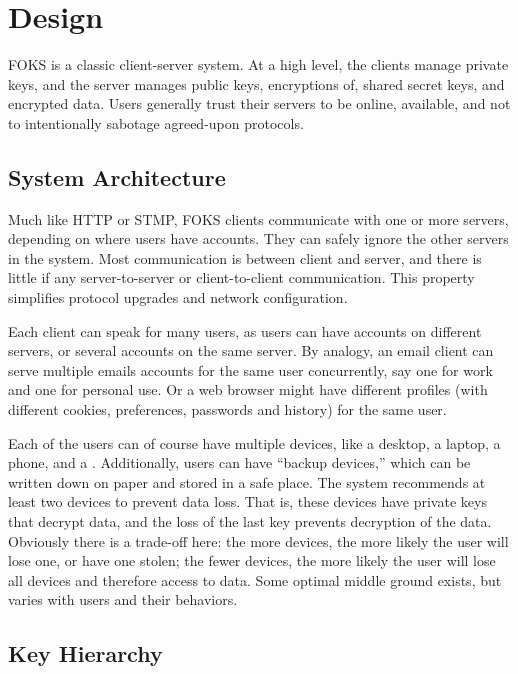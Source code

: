 
\section{Design}
\label{sec:design}

FOKS is a classic client-server system. At a high level, the clients
manage private keys, and the server manages public keys, encryptions of, 
shared secret keys, and encrypted data. Users generally trust their
servers to be online, available, and not to intentionally sabotage
agreed-upon protocols. 

\subsection{System Architecture}

Much like HTTP or STMP, FOKS clients communicate with one or more servers,
depending on where users have accounts. They can safely ignore the other servers
in the system. Most communication is between client and server, and there is
little if any server-to-server or client-to-client communication.  This
property simplifies protocol upgrades and network configuration.

Each client can speak for many users, as users can have accounts on different
servers, or several accounts on the same server. By analogy, an email client can
serve multiple emails accounts for the same user concurrently, say one for work
and one for personal use. Or a web browser might have different profiles (with
different cookies, preferences, passwords and history) for the same user.

Each of the users can of course have multiple devices, like a desktop, a laptop,
a phone, and a \yubi . Additionally, users can have ``backup devices,'' which can
be written down on paper and stored in a safe place. The system recommends at
least two devices to prevent data loss. That is, these devices have private keys
that decrypt data, and the loss of the last key prevents decryption of the data.
Obviously there is a trade-off here: the more devices, the more likely the user
will lose one, or have one stolen; the fewer devices, the more likely the user
will lose all devices and therefore access to data. Some optimal middle ground
exists, but varies with users and their behaviors. 

\subsection{Key Hierarchy}

